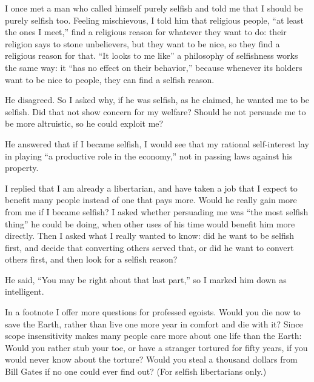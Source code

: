 
I once met a man who called himself purely selfish and told me that I should be purely selfish too. Feeling mischievous, I told him that religious people, ``at least the ones I meet,'' find a religious reason for whatever they want to do: their religion says to stone unbelievers, but they want to be nice, so they find a religious reason for that. ``It looks to me like'' a philosophy of selfishness works the same way: it ``has no effect on their behavior,'' because whenever its holders want to be nice to people, they can find a selfish reason. 

He disagreed. So I asked why, if he was selfish, as he claimed, he wanted me to be selfish. Did that not show concern for my welfare? Should he not persuade me to be more altruistic, so he could exploit me? 

He answered that if I became selfish, I would see that my rational self-interest lay in playing ``a productive role in the economy,'' not in passing laws against his property. 

I replied that I am already a libertarian, and have taken a job that I expect to benefit many people instead of one that pays more. Would he really gain more from me if I became selfish? I asked whether persuading me was ``the most selfish thing'' he could be doing, when other uses of his time would benefit him more directly. Then I asked what I really wanted to know: did he want to be selfish first, and decide that converting others served that, or did he want to convert others first, and then look for a selfish reason?

He said, ``You may be right about that last part,'' so I marked him down as intelligent. 

In a footnote I offer more questions for professed egoists. Would you die now to save the Earth, rather than live one more year in comfort and die with it? Since scope insensitivity makes many people care more about one life than the Earth: Would you rather stub your toe, or have a stranger tortured for fifty years, if you would never know about the torture?  Would you steal a thousand dollars from Bill Gates if no one could ever find out? (For selfish libertarians only.) 
